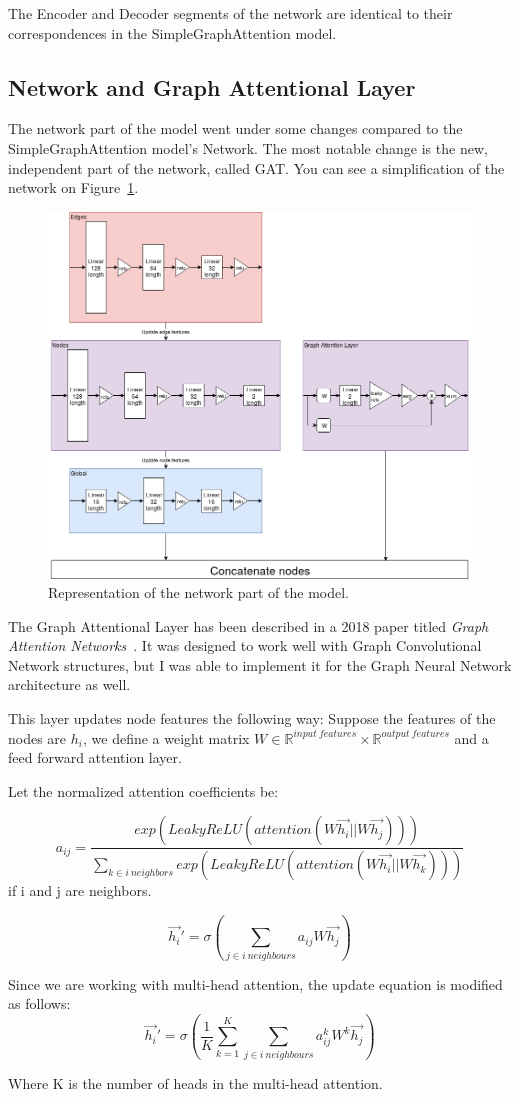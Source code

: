 The Encoder and Decoder segments of the network are identical to their correspondences in the SimpleGraphAttention model.

\subsection{Network and Graph Attentional Layer}
The network part of the model went under some changes compared to the SimpleGraphAttention model's Network. The most notable change is the new, independent part of the network, called GAT. You can see a simplification of the network on Figure~\ref{fig:graph-attention1-network}.

\begin{figure}[!ht]
	\centering
	\includegraphics[scale=0.5]{figures/GA1_network.png}
	\caption{Representation of the network part of the model.}
	\label{fig:graph-attention1-network}
\end{figure}

The Graph Attentional Layer has been described in a 2018 paper titled \textit{Graph Attention Networks}~\cite{GAT}. It was designed to work well with Graph Convolutional Network structures, but I was able to implement it for the Graph Neural Network architecture as well.

This layer updates node features the following way: Suppose the features of the nodes are \(h_i\), we define a weight matrix \(W \in \mathbb{R}^{input\ features} \times \mathbb{R}^{output\ features} \) and a feed forward attention layer.

Let the normalized attention coefficients be:

\[a_{ij} =  \frac{exp(LeakyReLU(attention(W\vec{h_i} || W\vec{h_j})))}{\sum_{k \in i\ neighbors} exp(LeakyReLU(attention(W\vec{h_i} || W\vec{h_k})))}\]
if i and j are neighbors.

\[\vec{h_i}' = \sigma(\sum_{j \in i\ neighbours}a_{ij}W\vec{h_j})\]

Since we are working with multi-head attention, the update equation is modified as follows:
\[\vec{h_i}' = \sigma(\frac{1}{K} \sum_{k=1}^{K}\sum_{j \in i\ neighbours}a_{ij}^kW^k\vec{h_j})\]

Where K is the number of heads in the multi-head attention.
